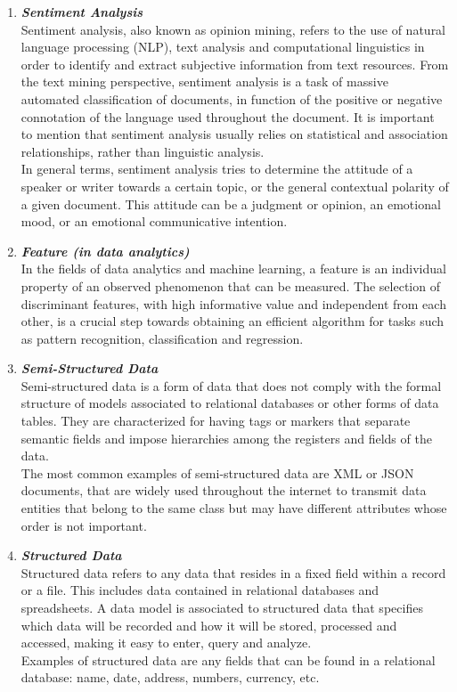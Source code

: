 \documentclass{article}
\begin{document}
\begin{enumerate}[label=(\alph*)]
\begin{enumerate}[label=\textbf{\arabic*.}]
            \item \textbf{\textit{Sentiment Analysis}}\\
Sentiment analysis, also known as opinion mining, refers to the use of natural language processing (NLP), text analysis and computational linguistics in order to identify and extract subjective information from text resources. From the text mining perspective, sentiment analysis is a task of massive automated classification of documents, in function of the positive or negative connotation of the language used throughout the document. It is important to mention that sentiment analysis usually relies on statistical and association relationships, rather than linguistic analysis.\\
In general terms, sentiment analysis tries to determine the attitude of a speaker or writer towards a certain topic, or the general contextual polarity of a given document. This attitude can be a judgment or opinion, an emotional mood, or an emotional communicative intention.
            
            \item \textbf{\textit{Feature (in data analytics)}}\\
In the fields of data analytics and machine learning, a feature is an individual property of an observed phenomenon that can be measured. The selection of discriminant features, with high informative value and independent from each other, is a crucial step towards obtaining an efficient algorithm for tasks such as pattern recognition, classification and regression.\\

            \item \textbf{\textit{Semi-Structured Data}}\\
Semi-structured data is a form of data that does not comply with the formal structure of models associated to relational databases or other forms of data tables. They are characterized for having tags or markers that separate semantic fields and impose hierarchies among the registers and fields of the data.\\
The most common examples of semi-structured data are XML or JSON documents, that are widely used throughout the internet to transmit data entities that belong to the same class but may have different attributes whose order is not important.
            
            \item \textbf{\textit{Structured Data}}\\
Structured data refers to any data that resides in a fixed field within a record or a file. This includes data contained in relational databases and spreadsheets. A data model is associated to structured data that specifies which data will be recorded and how it will be stored, processed and accessed, making it easy to enter, query and analyze.\\
Examples of structured data are any fields that can be found in a relational database: name, date, address, numbers, currency, etc.
            

\end{enumerate}
\end{enumerate}
\end{document}
